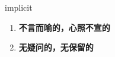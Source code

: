 
\begin{frame}
{\huge implicit}
\begin{center}
\begin{enumerate}\Large
  \item \textbf{不言而喻的，心照不宣的}
  \item \textbf{无疑问的，无保留的}
\end{enumerate}
\end{center}
\end{frame}
